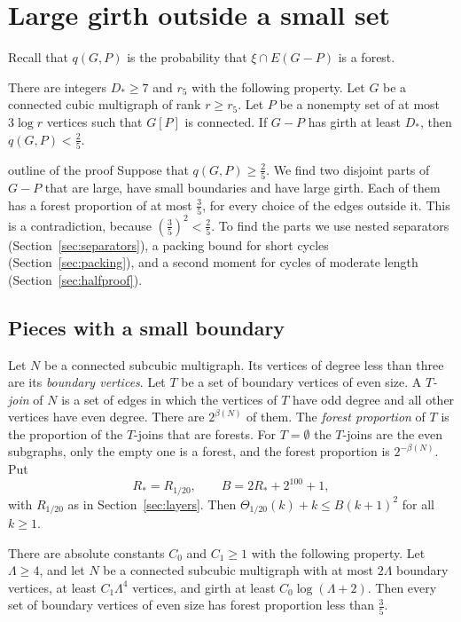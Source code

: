 \section{Large girth outside a small set}\label{sec:half}

Recall that $q(G,P)$ is the probability that $\xi\cap E(G-P)$ is a forest.

\begin{theorem}\label{thm:half}
There are integers $D_*\ge7$ and $r_5$ with the following property. Let $G$ be a connected cubic
multigraph of rank $r\ge r_5$. Let $P$ be a nonempty set of at most $3\log r$ vertices such that
$G[P]$ is connected. If $G-P$ has girth at least $D_*$, then $q(G,P)<\frac25$.
\end{theorem}

\begin{idea}{outline of the proof}
Suppose that $q(G,P)\ge\frac25$. We find two disjoint parts of $G-P$ that are large, have small
boundaries and have large girth. Each of them has a forest proportion of at most $\frac35$, for
every choice of the edges outside it. This is a contradiction, because $(\frac35)^{2}<\frac25$. To
find the parts we use nested separators (Section~\ref{sec:separators}), a packing bound for
short cycles (Section~\ref{sec:packing}), and a second moment for cycles of moderate length
(Section~\ref{sec:halfproof}).
\end{idea}

\subsection{Pieces with a small boundary}\label{sec:affine}

Let $N$ be a connected subcubic multigraph. Its vertices of degree less than three are its
\emph{boundary vertices}. Let $T$ be a set of boundary vertices of even size. A \emph{$T$-join} of
$N$ is a set of edges in which the vertices of $T$ have odd degree and all other vertices have
even degree. There are $2^{\beta(N)}$ of them. The \emph{forest proportion} of $T$ is the
proportion of the $T$-joins that are forests. For $T=\emptyset$ the $T$-joins are the even
subgraphs, only the empty one is a forest, and the forest proportion is $2^{-\beta(N)}$. Put
\[
  R_{*}=R_{1/20},\qquad B=2R_{*}+2^{100}+1,
\]
with $R_{1/20}$ as in Section~\ref{sec:layers}. Then $\Theta_{1/20}(k)+k\le B(k+1)^{2}$ for all
$k\ge1$.

\begin{lemma}\label{lem:affine}
There are absolute constants $C_0$ and $C_1\ge1$ with the following property. Let $\Lambda\ge4$,
and let $N$ be a connected subcubic multigraph with at most $2\Lambda$ boundary vertices, at
least $C_1\Lambda^{4}$ vertices, and girth at least $C_0\log(\Lambda+2)$. Then every set of
boundary vertices of even size has forest proportion less than $\frac35$.
\end{lemma}

